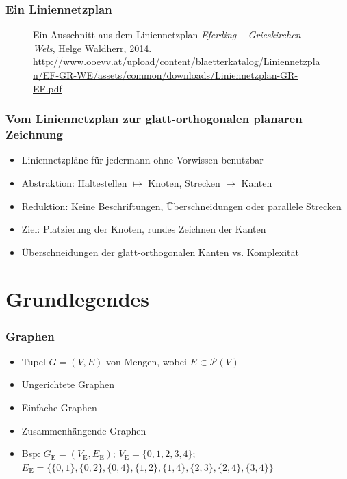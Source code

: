 \documentclass{beamer}
\begin{document}
\begin{frame}
  \frametitle{Ein Liniennetzplan}
  \begin{figure}[h]
    \centering
    \caption{Ein Ausschnitt aus dem Liniennetzplan \emph{Eferding -- Grieskirchen -- Wels}, Helge Waldherr, 2014. \footnotesize{\url{http://www.ooevv.at/upload/content/blaetterkatalog/Liniennetzplan/EF-GR-WE/assets/common/downloads/Liniennetzplan-GR-EF.pdf}}}
    \label{fig:liniennetzplan}
  \end{figure}
\end{frame}

\begin{frame}
  \frametitle{Vom Liniennetzplan zur glatt-orthogonalen planaren Zeichnung}
  \begin{itemize}[<+->]
    \item Liniennetzpläne für jedermann ohne Vorwissen benutzbar
    \item Abstraktion: Haltestellen $\mapsto$ Knoten, Strecken $\mapsto$ Kanten
    \item Reduktion: Keine Beschriftungen, Überschneidungen oder parallele Strecken
    \item Ziel: Platzierung der Knoten, rundes Zeichnen der Kanten
    \item Überschneidungen der glatt-orthogonalen Kanten vs. Komplexität
  \end{itemize}
\end{frame}


\section{Grundlegendes}
\frame{\tableofcontents[currentsection]}

\begin{frame}
  \frametitle{Graphen}
  \begin{itemize}[<+->]
    \item Tupel $G = (V, E)$ von Mengen, wobei $E \subset \mathcal{P}(V)$
    \item Ungerichtete Graphen
    \item Einfache Graphen
    \item Zusammenhängende Graphen
    \item Bsp: $G_\text{E} = (V_\text{E}, E_\text{E})$; $V_\text{E} = \{0, 1, 2, 3, 4\}$; $E_\text{E} = \{\{0, 1\}, \{0, 2\}, \{0, 4\}, \{1, 2\}, \{1, 4\}, \{2, 3\}, \{2, 4\}, \{3, 4\}\}$

  \end{itemize}
\end{frame}
\end{document}
